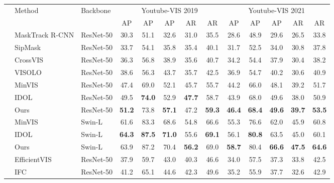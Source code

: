 \documentclass[10pt,twocolumn,letterpaper]{article}
\begin{document}
\begin{table*}[t]
\centering
\setlength{\tabcolsep}{2.0mm}
\vspace{-4mm}
\begin{tabular}{l|l|l|ccccc|ccccc}
	\multirow{2}{*}{} & \multirow{2}{*}{Method} & \multirow{2}{*}{Backbone} &  \multicolumn{5}{|c}{Youtube-VIS 2019} &  \multicolumn{5}{|c}{Youtube-VIS 2021} \\
	~ & ~ & ~ & AP &  AP & AP &  AR & AR & AP &  AP & AP &  AR & AR \\
	\hline
	\multirow{10}{*}{\rotatebox{90}{Online}} & MaskTrack R-CNN \cite{masktrackrcnn} & ResNet-50 & 30.3 & 51.1 & 32.6 & 31.0 & 35.5 & 28.6 & 48.9 & 29.6 & 26.5 & 33.8 \\
	~ & SipMask \cite{sipmask} & ResNet-50 & 33.7 & 54.1 & 35.8 & 35.4 & 40.1 & 31.7 & 52.5 & 34.0 & 30.8 & 37.8 \\
	~ & CrossVIS \cite{crossvis}& ResNet-50 & 36.3 & 56.8 & 38.9 & 35.6 & 40.7 & 34.2 & 54.4 & 37.9  & 30.4 & 38.2\\
	~ & VISOLO \cite{visolo}& ResNet-50 & 38.6 & 56.3 & 43.7 & 35.7 & 42.5 & 36.9 & 54.7 & 40.2 & 30.6 & 40.9 \\
	~ & MinVIS \cite{minvis}& ResNet-50 & 47.4 & 69.0 & 52.1 & 45.7 & 55.7 & 44.2 & 66.0 & 48.1 & 39.2 & 51.7 \\
	~ & IDOL \cite{idol}& ResNet-50 & 49.5 & \textbf{74.0} & 52.9 & \textbf{47.7} & 58.7 & 43.9 & 68.0 & 49.6 & 38.0 & 50.9 \\
	~ & Ours & ResNet-50 & \textbf{51.2} & 73.8 & \textbf{57.1} & 47.2 & \textbf{59.3} & \textbf{46.4} & \textbf{68.4} & \textbf{49.6} & \textbf{39.7} & \textbf{53.5} \\
	\cline{2-13}
	~ & MinVIS \cite{minvis}& Swin-L & 61.6 & 83.3 & 68.6 & 54.8 & 66.6 & 55.3 & 76.6 & 62.0 & 45.9 & 60.8 \\
	~ & IDOL \cite{idol}& Swin-L & \textbf{64.3} & \textbf{87.5} & \textbf{71.0} & 55.6 & \textbf{69.1} & 56.1 & \textbf{80.8} & 63.5 & 45.0 & 60.1 \\
	~ & Ours & Swin-L & 63.9 & 87.2 & 70.4 & \textbf{56.2} & 69.0 & \textbf{58.7} & 80.4 & \textbf{66.6} & \textbf{47.5} & \textbf{64.6}\\ 
	\hline
	\multirow{11}{*}{\rotatebox{90}{Offline}} & EfficientVIS \cite{efficientvis} & ResNet-50 & 37.9 & 59.7 & 43.0 & 40.3 & 46.6 & 34.0 & 57.5 & 37.3 & 33.8 & 42.5 \\
	~ & IFC \cite{ifc}& ResNet-50 & 41.2 & 65.1 & 44.6 & 42.3 & 49.6 & 35.2 & 55.9 & 37.7 & 32.6 & 42.9 \\

\end{tabular}
\end{table*}
\end{document}
